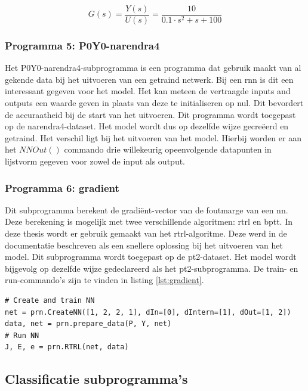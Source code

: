 		\begin{equation}\label{eq:pt2}
			G(s)= \frac{Y(s)}{U(s)} = \frac{10}{0.1 \cdot s^2 + s + 100}	
		\end{equation}
		
		\subsubsection{Programma 5: P0Y0-narendra4}
		Het P0Y0-narendra4-subprogramma is een programma dat gebruik maakt van al gekende data bij het uitvoeren van een getraind netwerk. Bij een \gls{rnn} is dit een interessant gegeven voor het model. Het kan meteen de vertraagde inputs and outputs een waarde geven in plaats van deze te initialiseren op nul. Dit bevordert de accuraatheid bij de start van het uitvoeren. Dit programma wordt toegepast op de narendra4-dataset. Het model wordt dus op dezelfde wijze gecre\"eerd en getraind. Het verschil ligt bij het uitvoeren van het model. Hierbij worden er aan het $NNOut()$ commando drie willekeurig opeenvolgende datapunten in lijstvorm gegeven voor zowel de input als output. 

		\subsubsection{Programma 6: gradient}
		Dit subprogramma berekent de gradi\"ent-vector van de foutmarge van een \gls{nn}. Deze berekening is mogelijk met twee verschillende algoritmen: \gls{rtrl} en \gls{bptt}. In deze thesis wordt er gebruik gemaakt van het \gls{rtrl}-algoritme. Deze werd in de documentatie beschreven als een snellere oplossing bij het uitvoeren van het model. Dit subprogramma wordt toegepast op de pt2-dataset. Het model wordt bijgevolg op dezelfde wijze gedeclareerd als het pt2-subprogramma. De train- en run-commando's zijn te vinden in listing \ref{lst:gradient}.
		
		\newpage
		
\begin{lstlisting}[caption={Cre\"eren, trainen en runnen van pyrenn-model voor gradient.}, captionpos=b,label={lst:gradient}]
# Create and train NN
net = prn.CreateNN([1, 2, 2, 1], dIn=[0], dIntern=[1], dOut=[1, 2])
data, net = prn.prepare_data(P, Y, net)
# Run NN
J, E, e = prn.RTRL(net, data)
\end{lstlisting}	

	\subsection{Classificatie subprogramma's}
		
